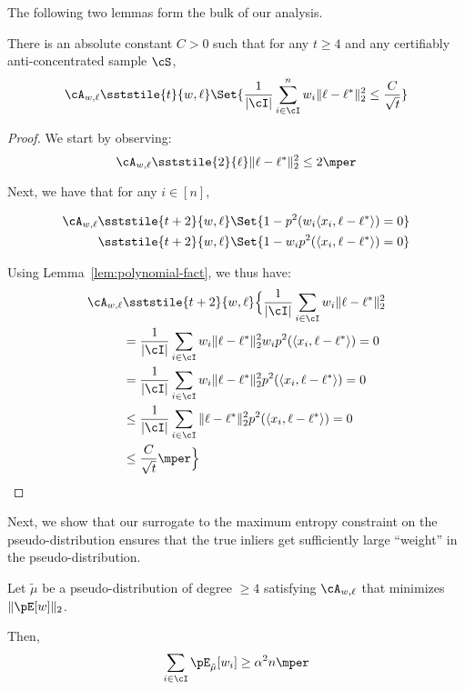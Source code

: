 The following two lemmas form the bulk of our analysis. 

\begin{lemma}
There is an absolute constant $C> 0$ such that for any $t \geq 4$ and any certifiably anti-concentrated sample $\cS$,
\[
\cA_{w,\ell} \sststile{t}{w,\ell} \Set{\frac{1}{|\cI|}\sum_{i \in \cI}^n w_i \|\ell - \ell^*\|^2_2\leq \frac{C}{\sqrt{t}}}
\]
\label{lem:close-on-inliers}
\end{lemma}

\begin{proof}
We start by observing:
\[
\cA_{w,\ell} \sststile{2}{\ell} \|\ell - \ell^*\|_2^2 \leq 2 \mper
\]

Next, we have that for any $i \in [n]$,

\begin{align*}
\cA_{w,\ell} &\sststile{t+2}{w,\ell} \Set{ 1-p^2 (w_i \langle x_i, \ell - \ell^* \rangle) = 0}\\
&\sststile{t+2}{w,\ell} \Set{1- w_i p^2 (\langle x_i, \ell - \ell^* \rangle) = 0}\\
\end{align*}

Using Lemma~\ref{lem:polynomial-fact}, we thus have:
\begin{align*}
\cA_{w,\ell}  &\sststile{t+2}{w,\ell} \Bigl\{ \frac{1}{|\cI|} \sum_{i \in \cI} w_i \|\ell-\ell^*\|_2^2 \\
&= \frac{1}{|\cI|} \sum_{i \in \cI} w_i \|\ell-\ell^*\|_2^2 w_i p^2 (\langle x_i, \ell-\ell^* \rangle) = 0\\
&= \frac{1}{|\cI|} \sum_{i \in \cI} w_i \|\ell-\ell^*\|_2^2 p^2 (\langle x_i, \ell-\ell^*\rangle) = 0\\
&\leq \frac{1}{|\cI|} \sum_{i \in \cI} \|\ell-\ell^*\|_2^2 p^2 (\langle x_i, \ell-\ell^* \rangle) = 0\\
&\leq \frac{C}{\sqrt{t}}\mper
\Bigr\}
\end{align*}

\end{proof}


Next, we show that our surrogate to the maximum entropy constraint on the pseudo-distribution ensures that the true inliers get sufficiently large ``weight'' in the pseudo-distribution. 

\begin{lemma}
Let $\tilde{\mu}$ be a pseudo-distribution of degree $\geq 4$ satisfying $\cA_{w,\ell}$ that minimizes $\|\pE[w]\|_2$. 



Then, 
\[
\sum_{i \in \cI} \pE_{\tilde{\mu}}[w_i] \geq \alpha^2 n \mper
\] \label{lem:large-weight-on-inliers}
\end{lemma}

